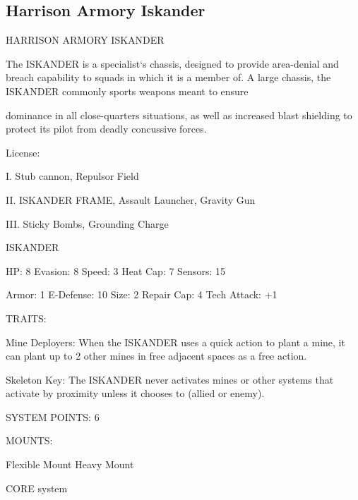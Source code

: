 \subsection{Harrison Armory Iskander}

                              HARRISON ARMORY ISKANDER  

The ISKANDER is a specialist‘s chassis, designed to provide area-denial and breach capability to squads in  
which it is a member of. A large chassis, the ISKANDER commonly sports weapons meant to ensure  

dominance in all close-quarters situations, as well as increased blast shielding to protect its pilot from  
deadly concussive forces. 
 
                                                   License:
 
I. Stub cannon, Repulsor Field
 
II. ISKANDER FRAME, Assault Launcher, Gravity Gun
 
III. Sticky Bombs, Grounding Charge
 

                                                ISKANDER 

 HP: 8          Evasion: 8                            Speed: 3           Heat Cap: 7        Sensors: 15 

 Armor: 1       E-Defense: 10                         Size: 2            Repair Cap: 4      Tech Attack:  
                                                                                            +1 

                                                  TRAITS: 

 Mine Deployers: When the ISKANDER uses a quick action to plant a mine, it can plant up to 2 other  
 mines in free adjacent spaces as a free action.
 
 Skeleton Key: The ISKANDER never activates mines or other systems that activate by proximity unless  
 it chooses to (allied or enemy). 

                                            SYSTEM POINTS: 6 

                                                  MOUNTS: 

 Flexible Mount                    Heavy Mount 

                                               CORE system 

                                                                                                            


